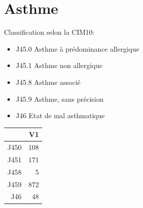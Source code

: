 \documentclass[12pt,english,french,twoside]{report}\usepackage[]{graphicx}\usepackage[]{color}
\begin{document}
\section{Asthme}

Classification selon la CIM10:
\begin{itemize}
  \item J45.0 Asthme à prédominance allergique
  \item J45.1 Asthme non allergique
  \item J45.8 Asthme associé 
  \item J45.9 Asthme, sans précision
  \item J46   Etat de mal asthmatique
\end{itemize}

\begin{table}[ht]
\centering
\begin{tabular}{rr}
  \hline
 & V1 \\ 
  \hline
J450 & 108 \\ 
  J451 & 171 \\ 
  J458 &   5 \\ 
  J459 & 872 \\ 
  J46 &  48 \\ 
   \hline
\end{tabular}
\end{table}
\end{document}
